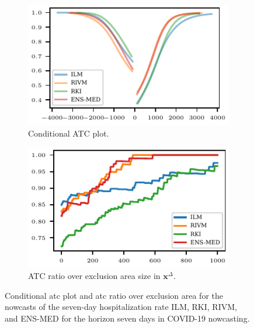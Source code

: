 \documentclass[pdflatex]{sn-jnl}
\theoremstyle{plain}%
\theoremstyle{definition}
\newcommand{\diffx}{\mathbf{x}^{\Delta}}
\begin{document}
\begin{figure}
    \centering
    \begin{subfigure}[t]{.48\textwidth}
    \includegraphics{plots/covid_nowcast/40_cond_prob_lag_7}
    \caption{Conditional ATC plot.}\label{fig:app-covid-cond-prob-7}
    \end{subfigure}\hfill
    \begin{subfigure}[t]{.48\textwidth}
    \includegraphics{plots/covid_nowcast/40_acc_eps_lag_7}
    \caption{ATC ratio over exclusion area size in $\diffx$.}\label{fig:app-covid-atc-ratio-7}
    \end{subfigure}
    \caption[Conditional ATC plot and ATC ratio over exclusion area for the COVID-19 nowcasts.]{Conditional \ac{atc} plot and \ac{atc} ratio over exclusion area for the nowcasts of the seven-day hospitalization rate ILM, RKI, RIVM, and ENS-MED for the horizon seven days in COVID-19 nowcasting.}
    \label{fig:app-covid-cond-prob-atc-ratio-7}
\end{figure}
\end{document}
